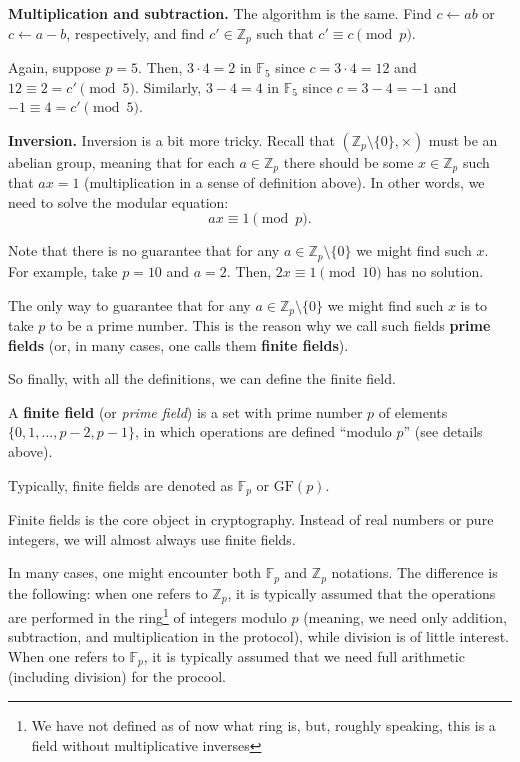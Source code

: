 \documentclass[../lecture-notes.tex]{subfiles}
\begin{document}
\textbf{Multiplication and subtraction.} The algorithm is the same. Find $c \gets ab$ or $c \gets a-b$, respectively, and find $c' \in \mathbb{Z}_p$ such that $c' \equiv c \pmod{p}$.

\begin{example}
    Again, suppose $p=5$. Then, $3 \cdot 4 = 2$ in $\mathbb{F}_5$ since $c=3 \cdot 4 = 12$ and $12 \equiv 2 = c' \pmod{5}$. Similarly, $3-4 = 4$ in $\mathbb{F}_5$ since $c=3-4=-1$ and $-1 \equiv 4 = c' \pmod{5}$.
\end{example}

\textbf{Inversion.} Inversion is a bit more tricky. Recall that $(\mathbb{Z}_p \setminus \{0\}, \times)$ must be an abelian group, meaning that for each $a \in \mathbb{Z}_p$ there should be some $x \in \mathbb{Z}_p$ such that $ax = 1$ (multiplication in a sense of definition above). In other words, we need to solve the modular equation:
\begin{equation}
    ax \equiv 1 \pmod{p}.
\end{equation}

Note that there is no guarantee that for any $a \in \mathbb{Z}_p \setminus \{0\}$ we might find such $x$. For example, take $p=10$ and $a=2$. Then, $2x \equiv 1 \pmod{10}$ has no solution. 

The only way to guarantee that for any $a \in \mathbb{Z}_p \setminus \{0\}$ we might find such $x$ is to take $p$ to be a prime number. This is the reason why we call such fields \textbf{prime fields} (or, in many cases, one calls them \textbf{finite fields}).

So finally, with all the definitions, we can define the finite field.

\begin{definition}
    A \textbf{finite field} (or \textit{prime field}) is a set with prime number $p$ of elements $\{0,1,\dots,p-2,p-1\}$, in which operations are defined ``modulo $p$'' (see details above). 

    Typically, finite fields are denoted as $\mathbb{F}_p$ or $\text{GF}(p)$.
\end{definition}

Finite fields is the core object in cryptography. Instead of real numbers or pure integers, we will almost always use finite fields.

\begin{remark}
    In many cases, one might encounter both $\mathbb{F}_p$ and $\mathbb{Z}_p$ notations. The difference is the following: when one refers to $\mathbb{Z}_p$, it is typically assumed that the operations are performed in the ring\footnote{We have not defined as of now what ring is, but, roughly speaking, this is a field without multiplicative inverses} of integers modulo $p$ (meaning, we need only addition, subtraction, and multiplication in the protocol), while division is of little interest. When one refers to $\mathbb{F}_p$, it is typically assumed that we need full arithmetic (including division) for the procool.
\end{remark}
\end{document}
